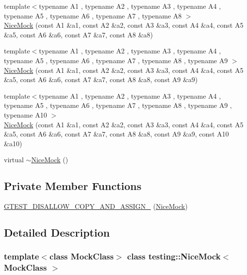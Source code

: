 \begin{DoxyCompactItemize}
\item 
{\footnotesize template$<$typename A1 , typename A2 , typename A3 , typename A4 , typename A5 , typename A6 , typename A7 , typename A8 $>$ }\\\hyperlink{classtesting_1_1NiceMock_ae8792aab6c024a50886856bf1093eedc}{Nice\+Mock} (const A1 \&a1, const A2 \&a2, const A3 \&a3, const A4 \&a4, const A5 \&a5, const A6 \&a6, const A7 \&a7, const A8 \&a8)
\item 
{\footnotesize template$<$typename A1 , typename A2 , typename A3 , typename A4 , typename A5 , typename A6 , typename A7 , typename A8 , typename A9 $>$ }\\\hyperlink{classtesting_1_1NiceMock_a61cfc9282222928590bcdaf851a806c6}{Nice\+Mock} (const A1 \&a1, const A2 \&a2, const A3 \&a3, const A4 \&a4, const A5 \&a5, const A6 \&a6, const A7 \&a7, const A8 \&a8, const A9 \&a9)
\item 
{\footnotesize template$<$typename A1 , typename A2 , typename A3 , typename A4 , typename A5 , typename A6 , typename A7 , typename A8 , typename A9 , typename A10 $>$ }\\\hyperlink{classtesting_1_1NiceMock_a4baf1da52f4c892fc02f6ba10c0b8c02}{Nice\+Mock} (const A1 \&a1, const A2 \&a2, const A3 \&a3, const A4 \&a4, const A5 \&a5, const A6 \&a6, const A7 \&a7, const A8 \&a8, const A9 \&a9, const A10 \&a10)
\item 
virtual \hyperlink{classtesting_1_1NiceMock_a4aaa6bd3850de6b6baa408010909a25f}{$\sim$\+Nice\+Mock} ()
\end{DoxyCompactItemize}
\subsection*{Private Member Functions}
\begin{DoxyCompactItemize}
\item 
\hyperlink{classtesting_1_1NiceMock_aee46eca734708818a8af94624eb512dd}{G\+T\+E\+S\+T\+\_\+\+D\+I\+S\+A\+L\+L\+O\+W\+\_\+\+C\+O\+P\+Y\+\_\+\+A\+N\+D\+\_\+\+A\+S\+S\+I\+G\+N\+\_\+} (\hyperlink{classtesting_1_1NiceMock}{Nice\+Mock})
\end{DoxyCompactItemize}


\subsection{Detailed Description}
\subsubsection*{template$<$class Mock\+Class$>$\newline
class testing\+::\+Nice\+Mock$<$ Mock\+Class $>$}



